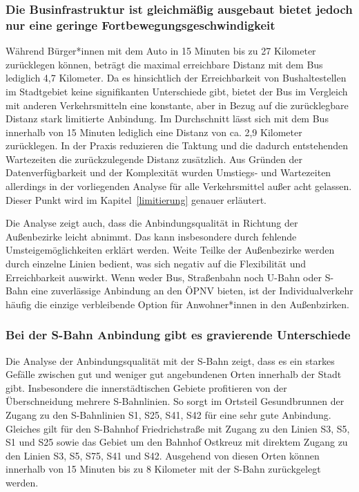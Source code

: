 \subsubsection{Die Businfrastruktur ist gleichmäßig ausgebaut bietet jedoch nur eine geringe Fortbewegungsgeschwindigkeit}
Während Bürger*innen mit dem Auto in 15 Minuten bis zu 27 Kilometer zurücklegen können, beträgt die maximal erreichbare Distanz mit dem Bus lediglich 4,7 Kilometer. Da es hinsichtlich der Erreichbarkeit von Bushaltestellen im Stadtgebiet keine signifikanten Unterschiede gibt, bietet der Bus im Vergleich mit anderen Verkehrsmitteln eine konstante, aber in Bezug auf die zurücklegbare Distanz stark limitierte Anbindung. Im Durchschnitt lässt sich mit dem Bus innerhalb von 15 Minuten lediglich eine Distanz von ca. 2,9 Kilometer zurücklegen. In der Praxis reduzieren die Taktung und die dadurch entstehenden Wartezeiten die zurückzulegende Distanz zusätzlich. Aus Gründen der Datenverfügbarkeit und der Komplexität wurden  Umstiegs- und Wartezeiten allerdings in der vorliegenden Analyse für alle Verkehrsmittel außer acht gelassen. Dieser Punkt wird im Kapitel~\ref{limitierung} genauer erläutert.


Die Analyse zeigt auch, dass die Anbindungsqualität in Richtung der Außenbezirke leicht abnimmt. Das kann insbesondere durch fehlende Umsteigemöglichkeiten erklärt werden. Weite Teilke der Außenbezirke werden durch einzelne Linien bedient, was sich negativ auf die Flexibilität und Erreichbarkeit auswirkt. Wenn weder Bus, Straßenbahn noch U-Bahn oder S-Bahn eine zuverlässige Anbindung an den ÖPNV bieten, ist der Individualverkehr häufig die einzige verbleibende Option für Anwohner*innen in den Außenbzirken.

\subsubsection{Bei der S-Bahn Anbindung gibt es gravierende Unterschiede}
Die Analyse der Anbindungsqualität mit der S-Bahn zeigt, dass es ein starkes Gefälle zwischen gut und weniger gut angebundenen Orten innerhalb der Stadt gibt. Insbesondere die innerstädtischen Gebiete profitieren von der Überschneidung mehrere S-Bahnlinien. So sorgt im Ortsteil Gesundbrunnen der Zugang zu den S-Bahnlinien S1, S25, S41, S42 für eine sehr gute Anbindung. Gleiches gilt für den S-Bahnhof Friedrichstraße mit Zugang zu den Linien S3, S5, S1 und S25 sowie das Gebiet um den Bahnhof Ostkreuz mit direktem Zugang zu den Linien S3, S5, S75, S41 und S42. Ausgehend von diesen Orten können innerhalb von 15 Minuten bis zu 8 Kilometer mit der S-Bahn zurückgelegt werden.

